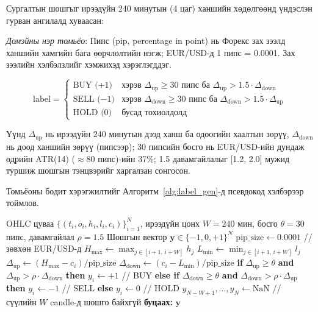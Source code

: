 Сургалтын шошгыг ирээдүйн 240 минутын (4 цаг) ханшийн хөдөлгөөнд үндэслэн гурван ангилалд хуваасан:

\noindent\textit{Домэйны нэр томьёо}: Пипс (pip, percentage in point) нь Форекс зах зээлд ханшийн хамгийн бага өөрчлөлтийн нэгж; EUR/USD-д 1 пипс = 0.0001. Зах зээлийн хэлбэлзлийг хэмжихэд хэрэглэгддэг.

\begin{equation}
\text{label} = \begin{cases}
    \text{BUY (+1)} & \text{хэрэв } \Delta_{\text{up}} \geq 30\text{ пипс ба } \Delta_{\text{up}} > 1.5 \cdot \Delta_{\text{down}} \\
    \text{SELL ($-$1)} & \text{хэрэв } \Delta_{\text{down}} \geq 30\text{ пипс ба } \Delta_{\text{down}} > 1.5 \cdot \Delta_{\text{up}} \\
    \text{HOLD (0)} & \text{бусад тохиолдолд}
\end{cases}
\end{equation}

Үүнд $\Delta_{\text{up}}$ нь ирээдүйн 240 минутын дээд ханш ба одоогийн хаалтын зөрүү, $\Delta_{\text{down}}$ нь доод ханшийн зөрүү (пипсээр); 30 пипсийн босго нь EUR/USD-ийн дундаж өдрийн ATR(14) ($\approx$80 пипс)-ийн 37\%; 1.5 давамгайлалыг [1.2, 2.0] мужид туршиж шошгын тэнцвэрийг харгалзан сонгосон.

Томьёоны бодит хэрэгжилтийг Алгоритм~\ref{alg:label_gen}-д псевдокод хэлбэрээр тоймлов.

\begin{algorithm}[H]
\caption{Шошго үүсгэх алгоритм}
\label{alg:label_gen}
\algrenewcommand{}
\algrenewcommand{}
\begin{algorithmic}[1]
\REQUIRE OHLC цуваа $\{(t_i, o_i, h_i, l_i, c_i)\}_{i=1}^{N}$, ирээдүйн цонх $W=240$ мин, босго $\theta=30$ пипс, давамгайлал $\rho=1.5$
\ENSURE Шошгын вектор $\mathbf{y} \in \{-1, 0, +1\}^N$
\STATE $\text{pip\_size} \gets 0.0001$ \quad // зөвхөн EUR/USD-д
    \STATE $H_{\max} \gets \max_{j \in [i+1,\, i+W]} h_j$
    \STATE $L_{\min} \gets \min_{j \in [i+1,\, i+W]} l_j$
    \STATE $\Delta_{\text{up}} \gets (H_{\max} - c_i) / \text{pip\_size}$
    \STATE $\Delta_{\text{down}} \gets (c_i - L_{\min}) / \text{pip\_size}$
    \STATE \textbf{if} $\Delta_{\text{up}} \geq \theta$ \textbf{and} $\Delta_{\text{up}} > \rho \cdot \Delta_{\text{down}}$ \textbf{then} $y_i \gets +1$ \quad // BUY
    \STATE \textbf{else if} $\Delta_{\text{down}} \geq \theta$ \textbf{and} $\Delta_{\text{down}} > \rho \cdot \Delta_{\text{up}}$ \textbf{then} $y_i \gets -1$ \quad // SELL
    \STATE \textbf{else} $y_i \gets 0$ \quad // HOLD
\ENDFOR
\STATE $y_{N-W+1}, \ldots, y_N \gets \text{NaN}$ \quad // сүүлийн $W$ candle-д шошго байхгүй
\STATE \textbf{буцаах:} $\mathbf{y}$
\end{algorithmic}
\end{algorithm}

